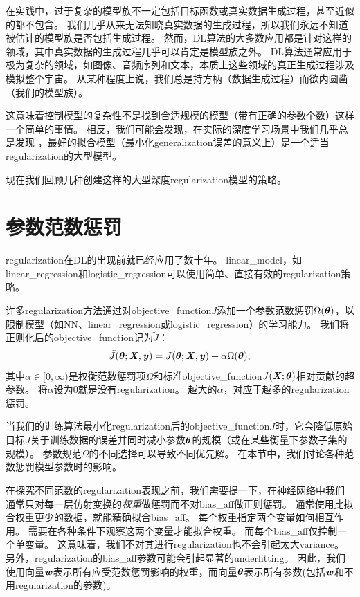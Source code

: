 在实践中，过于复杂的模型族不一定包括目标函数或真实数据生成过程，甚至近似的都不包含。
我们几乎从来无法知晓真实数据的生成过程，所以我们永远不知道被估计的模型族是否包括生成过程。
然而，\gls{DL}算法的大多数应用都是针对这样的领域，其中真实数据的生成过程几乎可以肯定是模型族之外。
\gls{DL}算法通常应用于极为复杂的领域，如图像、音频序列和文本，本质上这些领域的真正生成过程涉及模拟整个宇宙。
从某种程度上说，我们总是持方枘（数据生成过程）而欲内圆凿（我们的模型族）。

这意味着控制模型的复杂性不是找到合适规模的模型（带有正确的参数个数）这样一个简单的事情。
相反，我们可能会发现，在实际的深度学习场景中我们几乎总是发现
，最好的拟合模型（最小化\gls{generalization}误差的意义上）是一个适当\gls{regularization}的大型模型。

现在我们回顾几种创建这样的大型深度\gls{regularization}模型的策略。


\section{参数范数惩罚}
\label{sec:parameter_norm_penalties}
\gls{regularization}在\gls{DL}的出现前就已经应用了数十年。
\gls{linear_model}，如\gls{linear_regression}和\gls{logistic_regression}可以使用简单、直接有效的\gls{regularization}策略。

许多\gls{regularization}方法通过对\gls{objective_function}$J$添加一个参数范数惩罚$\Omega(\boldsymbol{\theta})$，以限制模型（如\gls{NN}、\gls{linear_regression}或\gls{logistic_regression}）的学习能力。
我们将正则化后的\gls{objective_function}记为$\tilde{J}$：
\begin{align}
 \tilde{J}(\boldsymbol{\theta};\boldsymbol{\mathit{X}}, \boldsymbol{\mathit{y}}) = J(\boldsymbol{\theta};\boldsymbol{\mathit{X}}, \boldsymbol{\mathit{y}}) + \alpha \Omega(\boldsymbol{\theta}),
\end{align}
其中$\alpha \in [0, \infty)$是权衡范数惩罚项$\Omega$和标准\gls{objective_function}$J(\boldsymbol{\mathit{X}};\boldsymbol{\theta})$相对贡献的超参数。
将$\alpha$设为0就是没有\gls{regularization}。
越大的$\alpha$，对应于越多的\gls{regularization}惩罚。

当我们的训练算法最小化\gls{regularization}后的\gls{objective_function}$\tilde{J}$时，它会降低原始目标$J$关于训练数据的误差并同时减小参数$\boldsymbol{\theta}$的规模（或在某些衡量下参数子集的规模）。
参数规范$\Omega$的不同选择可以导致不同优先解。
在本节中，我们讨论各种范数惩罚模型参数时的影响。

在探究不同范数的\gls{regularization}表现之前，我们需要提一下，在神经网络中我们通常只对每一层仿射变换的\emph{权重}做惩罚而不对\gls{bias_aff}做正则惩罚。
通常使用比拟合权重更少的数据，就能精确拟合\gls{bias_aff}。
每个权重指定两个变量如何相互作用。
需要在各种条件下观察这两个变量才能拟合权重。
而每个\gls{bias_aff}仅控制一个单变量。
这意味着，我们不对其进行\gls{regularization}也不会引起太大\gls{variance}。
另外，\gls{regularization}的\gls{bias_aff}参数可能会引起显著的\gls{underfitting}。
因此，我们使用向量$\boldsymbol{\mathit{w}}$表示所有应受范数惩罚影响的权重，而向量$\boldsymbol{\theta}$表示所有参数(包括$\boldsymbol{\mathit{w}}$和不用\gls{regularization}的参数)。

